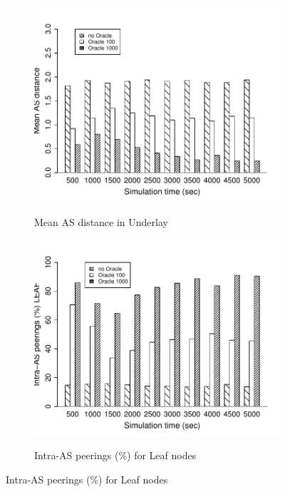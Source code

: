 \begin{figure}[tbp]
	\begin{subfigure}[]{0.32\linewidth}
     {\includegraphics[width=1\textwidth]{figures-pdf/asdist}}
    \caption{Mean AS distance in Underlay\label{fig:oracle:gnutella_metric:2a}}
    \end{subfigure}
 \hfill
    \begin{subfigure}[]{0.32\linewidth}
    {\includegraphics[width=1\textwidth]{figures-pdf/intraAS-leaf}}
    \caption{Intra-AS peerings (\%) for Leaf nodes\label{fig:oracle:gnutella_metric:2b}}
    \end{subfigure}

\end{figure}
